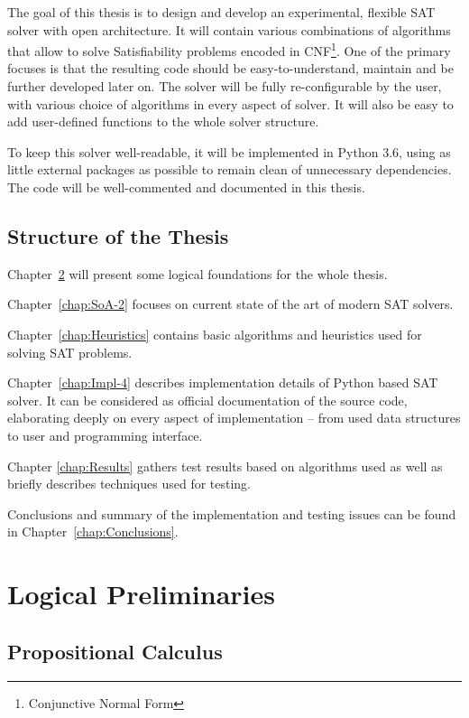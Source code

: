 \documentclass[12pt,english,pdflatex]{aghdpl}
\begin{document}
The goal of this thesis is to design and develop an experimental, flexible SAT solver with open architecture. It will contain various combinations of algorithms that allow to solve
Satisfiability problems encoded in CNF\footnote{Conjunctive Normal Form}. One of the primary focuses is that the resulting code
should be  easy-to-understand, maintain and be further developed later on. The solver will be fully
re-configurable by the user, with various choice of algorithms in
every aspect of solver. It will also be easy to add user-defined
functions to the whole solver structure. 

To keep this solver well-readable,
it will be implemented in Python 3.6, using as little external packages
as possible to remain clean of unnecessary dependencies.
The code will be well-commented and documented in this thesis.

\section{Structure of the Thesis}
\label{sec:structure}

Chapter~\ref{chap:logic} will present some logical foundations for the whole thesis.

Chapter~\ref{chap:SoA-2}  focuses on current state of the art of modern SAT solvers.

Chapter~\ref{chap:Heuristics}  contains basic algorithms and heuristics used for solving
SAT problems. 

Chapter~\ref{chap:Impl-4} describes implementation details of Python
based SAT solver. It can be considered as official documentation of
the source code, elaborating deeply on every aspect of implementation
-- from used data structures to user and programming interface. 

Chapter \ref{chap:Results}  gathers test results based on algorithms used as well as briefly
describes techniques used for testing. 

Conclusions and summary of the
implementation  and testing issues can be found in Chapter~\ref{chap:Conclusions}.

\chapter{Logical Preliminaries}
\label{chap:logic}
\section{Propositional Calculus}
\label{sec:PC}
\end{document}
